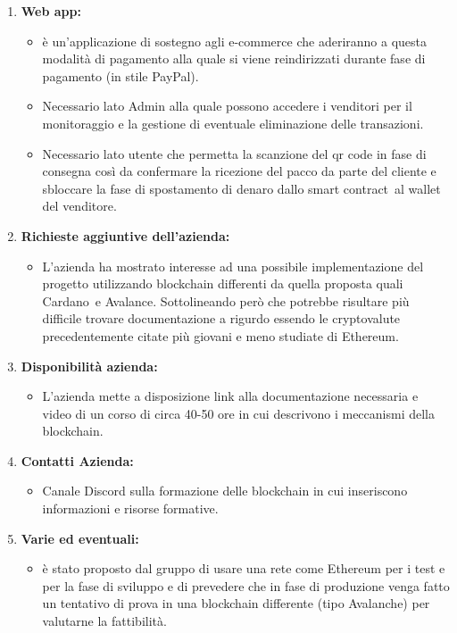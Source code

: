 \begin{enumerate}
	\item \textbf{Web app:}
	\begin{itemize}
		\item è un'applicazione di sostegno agli e-commerce che aderiranno a questa modalità di pagamento alla quale si viene reindirizzati durante fase di pagamento (in stile PayPal).
		\item Necessario lato Admin alla quale possono accedere i venditori per il monitoraggio e la gestione di eventuale eliminazione delle transazioni. 
		\item Necessario lato utente che permetta la scanzione del qr code in fase di consegna così da confermare la ricezione del pacco da parte del cliente e sbloccare la fase di spostamento di denaro dallo smart contract\glo\ al wallet del venditore.
	\end{itemize}

	\item \textbf{Richieste aggiuntive dell'azienda:}
	\begin{itemize}
		\item L'azienda ha mostrato interesse ad una possibile implementazione del progetto utilizzando blockchain differenti da quella proposta quali Cardano\glo\ e Avalance\glo.
		 Sottolineando però che potrebbe risultare più difficile trovare documentazione a rigurdo essendo le cryptovalute precedentemente citate più giovani e meno studiate di Ethereum\glo.
	\end{itemize}

	\item \textbf{Disponibilità azienda:}
	\begin{itemize}
		\item L'azienda mette a disposizione link alla documentazione necessaria e video di un corso di circa 40-50 ore in cui descrivono i meccanismi della blockchain.
		
	\end{itemize}

	\item \textbf{Contatti Azienda:}
	\begin{itemize}
		\item Canale Discord sulla formazione delle blockchain in cui inseriscono informazioni e risorse formative.
	\end{itemize}

	\item \textbf{Varie ed eventuali:}
	\begin{itemize}
		\item è stato proposto dal gruppo di usare una rete come Ethereum per i test e per la fase di sviluppo e di prevedere che in fase di produzione venga fatto un tentativo di prova in una blockchain differente (tipo Avalanche) per valutarne la fattibilità.
	\end{itemize}

\end{enumerate}

